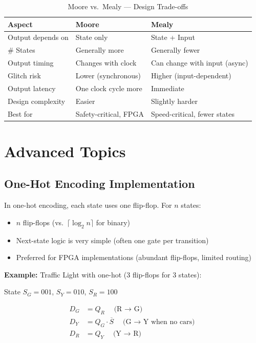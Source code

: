 \documentclass[12pt,a4paper]{article}
\begin{document}
\begin{table}[H]
\centering
\caption{Moore vs.\ Mealy --- Design Trade-offs}
\begin{tabular}{p{3.5cm}p{5cm}p{5cm}}
\toprule
\textbf{Aspect} & \textbf{Moore} & \textbf{Mealy} \\
\midrule
Output depends on & State only & State + Input \\
\# States & Generally more & Generally fewer \\
Output timing & Changes with clock & Can change with input (async) \\
Glitch risk & Lower (synchronous) & Higher (input-dependent) \\
Output latency & One clock cycle more & Immediate \\
Design complexity & Easier & Slightly harder \\
Best for & Safety-critical, FPGA & Speed-critical, fewer states \\
\bottomrule
\end{tabular}
\end{table}


\section{Advanced Topics}

\subsection{One-Hot Encoding Implementation}

In one-hot encoding, each state uses one flip-flop. For $n$ states:
\begin{itemize}
  \item $n$ flip-flops (vs.\ $\lceil\log_2 n\rceil$ for binary)
  \item Next-state logic is very simple (often one gate per transition)
  \item Preferred for FPGA implementations (abundant flip-flops, limited routing)
\end{itemize}

\textbf{Example:} Traffic Light with one-hot (3 flip-flops for 3 states):

State $S_G = 001$, $S_Y = 010$, $S_R = 100$

\begin{align}
D_{G} &= Q_R \quad\text{(R $\to$ G)} \\
D_{Y} &= Q_G \cdot \overline{S} \quad\text{(G $\to$ Y when no cars)} \\
D_{R} &= Q_Y \quad\text{(Y $\to$ R)}
\end{align}
\end{document}

